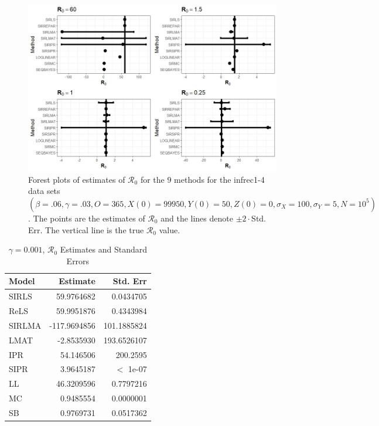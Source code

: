 \documentclass[12pt]{article}
\newcommand{\xxsir}{\ensuremath{9} } %
\newcommand{\rr}{\ensuremath{\mathcal{R}_0}}
\begin{document}
\begin{figure}[H]
  \centering
  \includegraphics[scale=0.5]{images/parchange.jpeg}
  \caption{Forest plots of estimates of $\rr$ for the \xxsir methods for the infrec1-4 data sets $(\beta=.06, \gamma=.03, O=365, X(0)=99950, Y(0)=50, Z(0)=0, \sigma_X=100, \sigma_Y=5, N=10^5)$.  The points are the estimates of $\rr$ and the lines denote $\pm 2\cdot $Std. Err.  The vertical line is the true $\rr$ value.}
  \label{fig:infrec1-res}
\end{figure}
\begin{table}[H]

	\centering
	\begin{tabular}[t]{l|r|r}
		\hline
		Model & Estimate & Std. Err\\
		\hline
		SIRLS & 59.9764682 & 0.0434705\\
		\hline
		ReLS & 59.9951876 & 0.4343984\\
		\hline
		SIRLMA &  -117.9694856 & 101.1885824\\
		\hline
		LMAT & -2.8535930 & 193.6526107 \\
		\hline
		IPR & 54.146506 & 200.2595\\
		\hline
		SIPR & 3.9645187 & $<$ 1e-07\\
		\hline
		LL & 46.3209596 & 0.7797216\\
		\hline
		MC & 0.9485554 & 0.0000001\\
		\hline
		SB & 0.9769731 & 0.0517362\\
		\hline
	\end{tabular}
        \caption{\label{tab:infrec1-res}$\gamma = 0.001$, $\rr$ Estimates and Standard Errors}
\end{table}
\end{document}
